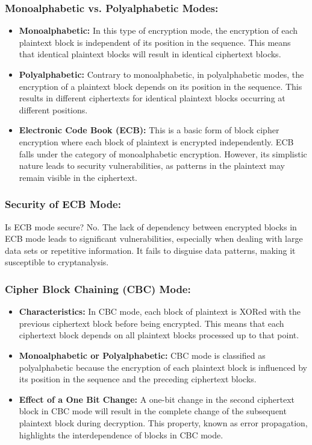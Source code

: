 \documentclass[12pt]{article}
\begin{document}
\subsubsection*{Monoalphabetic vs. Polyalphabetic Modes:}
\begin{itemize}
    \item \textbf{Monoalphabetic:} In this type of encryption mode, the encryption of each plaintext block is independent of its position in the sequence. This means that identical plaintext blocks will result in identical ciphertext blocks.
    \item \textbf{Polyalphabetic:} Contrary to monoalphabetic, in polyalphabetic modes, the encryption of a plaintext block depends on its position in the sequence. This results in different ciphertexts for identical plaintext blocks occurring at different positions.
    \item \textbf{Electronic Code Book (ECB):} This is a basic form of block cipher encryption where each block of plaintext is encrypted independently. ECB falls under the category of monoalphabetic encryption. However, its simplistic nature leads to security vulnerabilities, as patterns in the plaintext may remain visible in the ciphertext.
\end{itemize}

\subsubsection*{Security of ECB Mode:}
Is ECB mode secure? No. The lack of dependency between encrypted blocks in ECB mode leads to significant vulnerabilities, especially when dealing with large data sets or repetitive information. It fails to disguise data patterns, making it susceptible to cryptanalysis.

\subsubsection*{Cipher Block Chaining (CBC) Mode:}
\begin{itemize}
    \item \textbf{Characteristics:} In CBC mode, each block of plaintext is XORed with the previous ciphertext block before being encrypted. This means that each ciphertext block depends on all plaintext blocks processed up to that point.
    \item \textbf{Monoalphabetic or Polyalphabetic:} CBC mode is classified as polyalphabetic because the encryption of each plaintext block is influenced by its position in the sequence and the preceding ciphertext blocks.
    \item \textbf{Effect of a One Bit Change:} A one-bit change in the second ciphertext block in CBC mode will result in the complete change of the subsequent plaintext block during decryption. This property, known as error propagation, highlights the interdependence of blocks in CBC mode.
\end{itemize}
\end{document}
